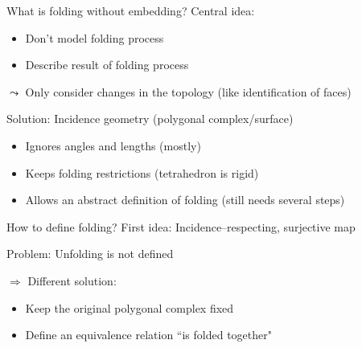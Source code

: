 
\begin{frame}{What is folding without embedding?}
    \pause
    Central idea:
    \begin{itemize}
        \pause
        \item Don't model folding process
        \pause
        \item Describe result of folding process
    \end{itemize}

    \pause
    $\leadsto$ Only consider changes in the topology 
    \pause (like identification of faces)
    \newline

    \pause
    Solution: Incidence geometry (polygonal complex/surface)
    \begin{itemize}
        \pause
        \item Ignores angles and lengths (mostly)
        \pause
        \item Keeps folding restrictions (tetrahedron is rigid)
        \pause
        \item Allows an abstract definition of folding \pause (still needs several steps)
    \end{itemize}

\end{frame}


\begin{frame}{How to define folding?}
    \pause
    First idea: Incidence--respecting, surjective map

    \pause
    Problem: Unfolding is not defined

    \pause
    $\Rightarrow$ Different solution:
    \begin{itemize}
        \pause
        \item Keep the original polygonal complex fixed
        \pause
        \item Define an equivalence relation ``is folded together"
    \end{itemize}
\end{frame}


